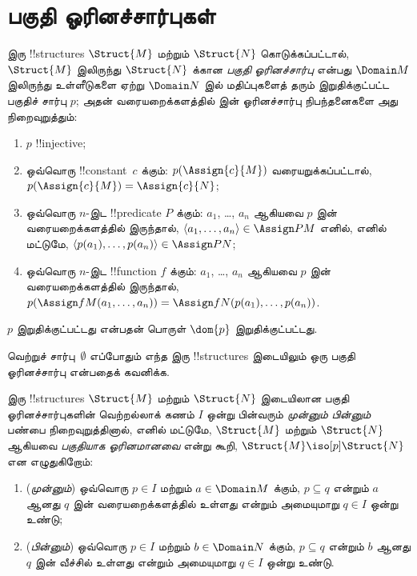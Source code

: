 \documentclass[../../../include/open-logic-section]{subfiles}
\begin{document}

\section{பகுதி ஓரினச்சார்புகள்}

\begin{defn}
  இரு !!{structure}s $\Struct{M}$ மற்றும் $\Struct{N}$ கொடுக்கப்பட்டால்,
  $\Struct{M}$ இலிருந்து $\Struct{N}$ க்கான \emph{பகுதி ஓரினச்சார்பு}
  என்பது $\Domain M$ இலிருந்து உள்ளீடுகளை ஏற்று $\Domain N$ இல்
  மதிப்புகளைத் தரும் இறுதிக்குட்பட்ட பகுதிச் சார்பு $p$; அதன்
  வரையறைக்களத்தில்  இன் ஓரினச்சார்பு
  நிபந்தனைகளை அது நிறைவுறுத்தும்:
  \begin{enumerate}
  \item $p$ !!{injective};
  \item ஒவ்வொரு !!{constant}~$c$ க்கும்: $p(\Assign{c}{M})$
    வரையறுக்கப்பட்டால், $p(\Assign{c}{M}) = \Assign{c}{N}$;
  \item ஒவ்வொரு $n$-இட !!{predicate} $P$ க்கும்: $a_1$, \dots, $a_n$
    ஆகியவை $p$ இன் வரையறைக்களத்தில் இருந்தால், $\langle a_1, \dots,
    a_n\rangle \in \Assign P M$ எனில், எனில் மட்டுமே,
    $\langle p(a_1), \dots, p(a_n) \rangle
    \in \Assign P N$;
  \item ஒவ்வொரு $n$-இட !!{function} $f$ க்கும்: $a_1$, \dots, $a_n$
    ஆகியவை $p$ இன் வரையறைக்களத்தில் இருந்தால்,
    $p(\Assign f M (a_1, \dots,a_n))
    = \Assign f N (p(a_1), \dots, p(a_n))$.
  \end{enumerate}
  $p$ இறுதிக்குட்பட்டது என்பதன் பொருள் $\dom{p}$ இறுதிக்குட்பட்டது.
\end{defn}

வெற்றுச் சார்பு~$\emptyset$ எப்போதும் எந்த இரு !!{structure}s
இடையிலும் ஒரு பகுதி ஓரினச்சார்பு என்பதைக் கவனிக்க.

\begin{defn}
  இரு !!{structure}s $\Struct{M}$ மற்றும் $\Struct{N}$ இடையிலான
  பகுதி ஓரினச்சார்புகளின் வெற்றல்லாக் கணம் $I$ ஒன்று பின்வரும்
  \emph{முன்னும் பின்னும்} பண்பை நிறைவுறுத்தினால், எனில் மட்டுமே,
  $\Struct{M}$ மற்றும் $\Struct{N}$ ஆகியவை \emph{பகுதியாக
  ஓரினமானவை} என்று கூறி, $\Struct{M} \iso[p]
  \Struct{N}$ என எழுதுகிறோம்:
  \begin{enumerate}
  \item (\emph{முன்னும்}) ஒவ்வொரு $p \in I$ மற்றும்
    $a \in \Domain M$ க்கும், $p \subseteq q$ என்றும் $a$ ஆனது
    $q$ இன் வரையறைக்களத்தில் உள்ளது என்றும் அமையுமாறு $q \in I$
    ஒன்று உண்டு;
  \item (\emph{பின்னும்}) ஒவ்வொரு $p \in I$ மற்றும்
    $b \in \Domain N$ க்கும், $p \subseteq q$ என்றும் $b$ ஆனது
    $q$ இன் வீச்சில் உள்ளது என்றும் அமையுமாறு $q \in I$ ஒன்று உண்டு.
  \end{enumerate}
\end{defn}
\end{document}
